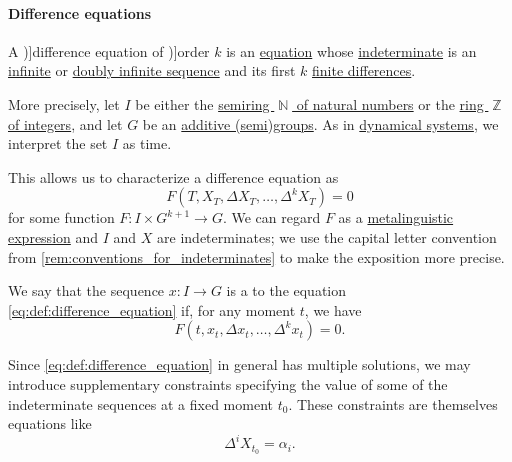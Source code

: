 \paragraph{Difference equations}

\begin{definition}\label{def:difference_equation}\mimprovised
  A \term[ru=разностное уравнение (\cite[307]{Гельфонд1959ИсчислениеКонечныхРазностей})]{difference equation} of \term[ru=порядок (разностного уравнения) (\cite[307]{Гельфонд1959ИсчислениеКонечныхРазностей})]{order} \( k \) is an \hyperref[def:equation]{equation} whose \hyperref[con:free_construction/indeterminate]{indeterminate} is an \hyperref[def:sequence]{infinite} or \hyperref[def:doubly_infinite_sequence]{doubly infinite sequence} and its first \( k \) \hyperref[def:finite_difference_operator]{finite differences}.

  More precisely, let \( I \) be either the \hyperref[def:natural_numbers]{semiring \( \BbbN \) of natural numbers} or the \hyperref[def:integers]{ring \( \BbbZ \) of integers}, and let \( G \) be an \hyperref[def:additive_semigroup]{additive (semi)groups}. As in \hyperref[def:dynamical_system]{dynamical systems}, we interpret the set \( I \) as time.

  This allows us to characterize a difference equation as
  \begin{equation}\label{eq:def:difference_equation}
    F(T, X_T, \Delta X_T, \ldots, \Delta^k X_T) = 0
  \end{equation}
  for some function \( F: I \times G^{k+1} \to G \). We can regard \( F \) as a \hyperref[con:expression]{metalinguistic expression} and \( I \) and \( X \) are indeterminates; we use the capital letter convention from \cref{rem:conventions_for_indeterminates} to make the exposition more precise.

  \begin{thmenum}
     We say that the sequence \( x: I \to G \) is a  to the equation \eqref{eq:def:difference_equation} if, for any moment \( t \), we have
    \begin{equation*}
      F(t, x_t, \Delta x_t, \ldots, \Delta^k x_t) = 0.
    \end{equation*}

     Since \eqref{eq:def:difference_equation} in general has multiple solutions, we may introduce supplementary constraints specifying the value of some of the indeterminate sequences at a fixed moment \( t_0 \). These constraints are themselves equations like
    \begin{equation*}
      \Delta^i X_{t_0} = \alpha_i.
    \end{equation*}


\end{thmenum}
\end{definition}
